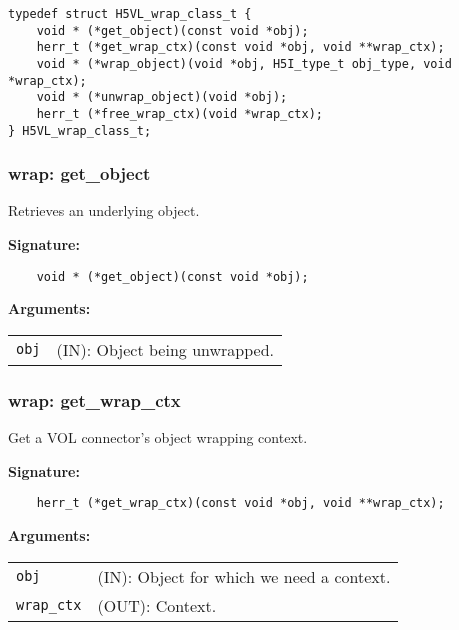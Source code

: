 \begin{lstlisting}[caption={Wrap class for object wrapping routines, H5VLconnector.h}, captionpos=b, label={lst:Wrapclass}]
typedef struct H5VL_wrap_class_t {                                               
    void * (*get_object)(const void *obj);
    herr_t (*get_wrap_ctx)(const void *obj, void **wrap_ctx);
    void * (*wrap_object)(void *obj, H5I_type_t obj_type, void *wrap_ctx);
    void * (*unwrap_object)(void *obj);
    herr_t (*free_wrap_ctx)(void *wrap_ctx);
} H5VL_wrap_class_t; 
\end{lstlisting}

\subsubsection{wrap: get\_object}
Retrieves an underlying object.

\begin{mdframed}[style=bgbox]
\textbf{Signature:}
\begin{lstlisting}
    void * (*get_object)(const void *obj);
\end{lstlisting}

\textbf{Arguments:}\\
\begin{tabular}{l p{13.5cm}}
  \texttt{obj} & (IN): Object being unwrapped.\\
\end{tabular}
\end{mdframed}


\subsubsection{wrap: get\_wrap\_ctx}
Get a VOL connector's object wrapping context.

\begin{mdframed}[style=bgbox]
\textbf{Signature:}
\begin{lstlisting}
    herr_t (*get_wrap_ctx)(const void *obj, void **wrap_ctx);
\end{lstlisting}

\textbf{Arguments:}\\
\begin{tabular}{l p{13.5cm}}
  \texttt{obj} & (IN): Object for which we need a context.\\
  \texttt{wrap\_ctx} & (OUT): Context.\\
\end{tabular}
\end{mdframed}

